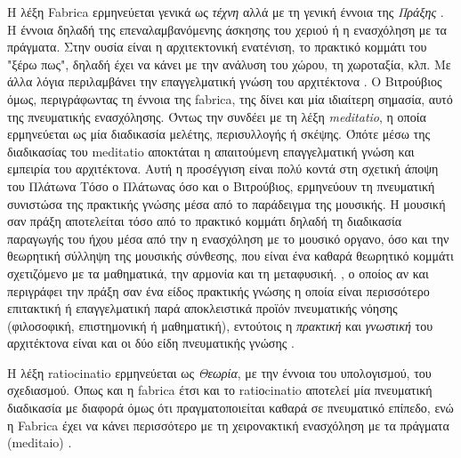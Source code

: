 \begin{description}[style=nextline]
\item[Fabrica]

Η λέξη Fabrica ερμηνεύεται γενικά ως \emph{τέχνη} αλλά με τη γενική έννοια της \emph{Πράξης} \cite{vitruvius-lefas,graham-education}. Η έννοια δηλαδή της επεναλαμβανόμενης άσκησης του χεριού ή η ενασχόληση με τα πράγματα. Στην ουσία είναι η αρχιτεκτονική ενατένιση, το πρακτικό κομμάτι του "ξέρω πως", δηλαδή έχει να κάνει με την ανάλυση του χώρου, τη χωροταξία, κλπ. Με άλλα λόγια περιλαμβάνει την επαγγελματική γνώση του αρχιτέκτονα \cite{graham-education}. Ο Βιτρούβιος όμως, περιγράφωντας τη έννοια της fabrica, της δίνει και μία ιδιαίτερη σημασία, αυτό της πνευματικής ενασχόλησης. Όντως την συνδέει με τη λέξη \emph{meditatio}, η οποία ερμηνεύεται ως μία διαδικασία μελέτης, περισυλλογής ή σκέψης. Όπότε μέσω της διαδικασίας του meditatio αποκτάται η απαιτούμενη επαγγελματική γνώση και εμπειρία του αρχιτέκτονα. Αυτή η προσέγγιση είναι πολύ κοντά στη σχετική άποψη του Πλάτωνα\sidenote%
{Τόσο ο Πλάτωνας όσο και ο Βιτρούβιος, ερμηνεύουν τη πνευματική συνιστώσα της πρακτικής γνώσης μέσα από το παράδειγμα της μουσικής. Η μουσική σαν πράξη αποτελείται τόσο από το πρακτικό κομμάτι δηλαδή τη διαδικασία παραγωγής του ήχου μέσα από την η ενασχόληση με το μουσικό οργανο, όσο και την θεωρητική σύλληψη της μουσικής σύνθεσης, που είναι ένα καθαρά θεωρητικό κομμάτι σχετιζόμενο με τα μαθηματικά, την αρμονία και τη μεταφυσική.}
, ο οποίος αν και περιγράφει την πράξη σαν ένα είδος πρακτικής γνώσης η οποία είναι περισσότερο επιτακτική ή επαγγελματική παρά αποκλειστικά προϊόν πνευματικής νόησης (φιλοσοφική, επιστημονική ή μαθηματική), εντούτοις η \emph{πρακτική} και \emph{γνωστική} του αρχιτέκτονα είναι και οι δύο είδη πνευματικής γνώσης \cite{graham-education}.  


\item[Ratiocinatio]

Η λέξη ratiocinatio ερμηνεύεται ως \emph{Θεωρία}, με την έννοια του υπολογισμού, του σχεδιασμού.  Όπως και η fabrica έτσι και το ratiοcinatio αποτελεί μία πνευματική διαδικασία με διαφορά όμως ότι πραγματοποιείται καθαρά σε πνευματικό επίπεδο, ενώ η Fabrica έχει να κάνει περισσότερο με τη χειρονακτική ενασχόληση με τα πράγματα (meditaio) \cite{vitruvius-lefas}.


\end{description}

